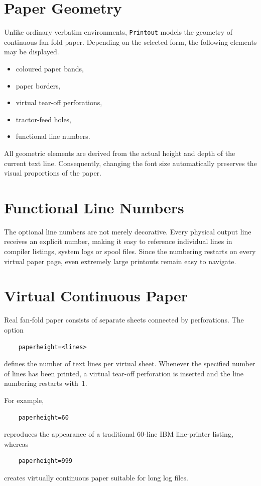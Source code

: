 \documentclass[
11pt,
a4paper,
oneside
]{scrbook}
\begin{document}
{\section{Paper Geometry}
Unlike ordinary verbatim environments, \texttt{Printout} models the
geometry of continuous fan-fold paper.
Depending on the selected form, the following elements may be displayed.
\begin{itemize}
	\item coloured paper bands,
	\item paper borders,
	\item virtual tear-off perforations,
	\item tractor-feed holes,
	\item functional line numbers.
\end{itemize}
All geometric elements are derived from the actual height and depth of
the current text line. Consequently, changing the font size
automatically preserves the visual proportions of the paper.

\section{Functional Line Numbers}
The optional line numbers are not merely decorative.
Every physical output line receives an explicit number, making it easy
to reference individual lines in compiler listings, system logs or spool
files.
Since the numbering restarts on every virtual paper page, even extremely
large printouts remain easy to navigate.

\section{Virtual Continuous Paper}

Real fan-fold paper consists of separate sheets connected by
perforations.
The option
\begin{verbatim}
	paperheight=<lines>
\end{verbatim}
defines the number of text lines per virtual sheet.
Whenever the specified number of lines has been printed, a virtual
tear-off perforation is inserted and the line numbering restarts with~1.

\noindent For example,
\begin{verbatim}
	paperheight=60
\end{verbatim}
reproduces the appearance of a traditional 60-line IBM line-printer
listing, whereas
\begin{verbatim}
	paperheight=999
\end{verbatim}
creates virtually continuous paper suitable for long log files.
}
\end{document}
